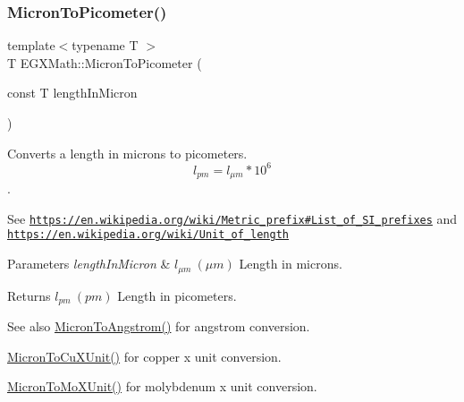 \subsubsection{\texorpdfstring{Micron\+To\+Picometer()}{MicronToPicometer()}}
{\footnotesize\ttfamily template$<$typename T $>$ \\
T E\+G\+X\+Math\+::\+Micron\+To\+Picometer (\begin{DoxyParamCaption}\item[{const T}]{length\+In\+Micron }\end{DoxyParamCaption})}



Converts a length in microns to picometers. \[ l_{pm}=l_{\mu m} * 10^{6} \]. 

See \href{https://en.wikipedia.org/wiki/Metric_prefix#List_of_SI_prefixes}{\tt https\+://en.\+wikipedia.\+org/wiki/\+Metric\+\_\+prefix\#\+List\+\_\+of\+\_\+\+S\+I\+\_\+prefixes} and \href{https://en.wikipedia.org/wiki/Unit_of_length}{\tt https\+://en.\+wikipedia.\+org/wiki/\+Unit\+\_\+of\+\_\+length} 
\begin{DoxyParams}{Parameters}
{\em length\+In\+Micron} & $ l_{\mu m}\ (\mu m)$ Length in microns. \\
\hline
\end{DoxyParams}
\begin{DoxyReturn}{Returns}
$ l_{pm}\ (pm)$ Length in picometers. 
\end{DoxyReturn}
\begin{DoxySeeAlso}{See also}
\mbox{\hyperlink{group___e_g_x_math-_conversions-_length_conversions-_non-_s_i-_micron-_non-_s_i_ga34f8c07bfb65b584298dd7be114b85ad}{Micron\+To\+Angstrom()}} for angstrom conversion. 

\mbox{\hyperlink{group___e_g_x_math-_conversions-_length_conversions-_non-_s_i-_micron-_non-_s_i_gaa582745d86b8b016faa9ad442b18ce8f}{Micron\+To\+Cu\+X\+Unit()}} for copper x unit conversion. 

\mbox{\hyperlink{group___e_g_x_math-_conversions-_length_conversions-_non-_s_i-_micron-_non-_s_i_ga4bdfec28657cb037fc0830a95ceb79ca}{Micron\+To\+Mo\+X\+Unit()}} for molybdenum x unit conversion. 
\end{DoxySeeAlso}
\mbox{\label{group___e_g_x_math-_conversions-_length_conversions-_non-_s_i-_micron-_s_i_gaa71029484f59849bac474cfbeda0db5d}} 
